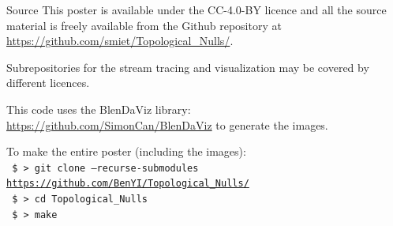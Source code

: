 \documentclass[final]{beamer}
\newlength{\sepwid}
\newlength{\onecolwid}
\newlength{\twocolwid}
\begin{document}
\begin{frame}[t]
\begin{columns}[t]
\begin{column}{\twocolwid}
\begin{columns}[t,totalwidth=\twocolwid]
\begin{column}{\onecolwid}
\begin{block}{Source}
	\vspace{1cm}
This poster is available under the  CC-4.0-BY  licence and all the source material is freely
available from the Github repository at \url{https://github.com/smiet/Topological_Nulls/}.

Subrepositories for the stream tracing and visualization may be covered by different licences. 

This code uses the BlenDaViz library: \url{https://github.com/SimonCan/BlenDaViz} to generate the images. 

    To make the entire poster (including the images):\\
\texttt{
	\$ > git clone --recurse-submodules  \url{https://github.com/BenYI/Topological_Nulls/}}\\
\texttt{
    \$ > cd Topological\_Nulls\\
  }
\texttt{
    \$ > make
  }


\end{block}
\end{column}
\end{columns}

\end{column}
\begin{column}{\sepwid}\end{column} %


\end{columns} %

\end{frame} %
\end{document}
